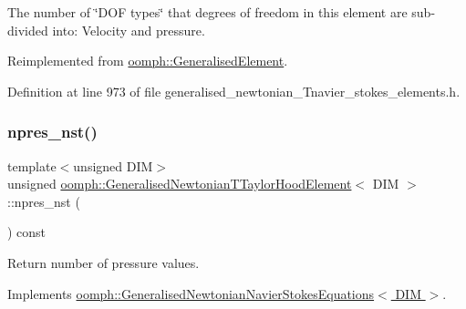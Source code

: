 The number of \char`\"{}\+D\+O\+F types\char`\"{} that degrees of freedom in this element are sub-\/divided into\+: Velocity and pressure. 



Reimplemented from \hyperlink{classoomph_1_1GeneralisedElement_a0c6037a870597b35dcf1c780710b9a56}{oomph\+::\+Generalised\+Element}.



Definition at line 973 of file generalised\+\_\+newtonian\+\_\+\+Tnavier\+\_\+stokes\+\_\+elements.\+h.

\mbox{\label{classoomph_1_1GeneralisedNewtonianTTaylorHoodElement_a290fdfa0f87a6d4a52823c082c298b4f}} 
\subsubsection{\texorpdfstring{npres\+\_\+nst()}{npres\_nst()}\hspace{0.1cm}{\footnotesize\ttfamily [1/3]}}
{\footnotesize\ttfamily template$<$unsigned D\+IM$>$ \\
unsigned \hyperlink{classoomph_1_1GeneralisedNewtonianTTaylorHoodElement}{oomph\+::\+Generalised\+Newtonian\+T\+Taylor\+Hood\+Element}$<$ D\+IM $>$\+::npres\+\_\+nst (\begin{DoxyParamCaption}{ }\end{DoxyParamCaption}) const\hspace{0.3cm}{\ttfamily [virtual]}}



Return number of pressure values. 



Implements \hyperlink{classoomph_1_1GeneralisedNewtonianNavierStokesEquations_ad25a5d1b7a7e7cf128b9154f08739824}{oomph\+::\+Generalised\+Newtonian\+Navier\+Stokes\+Equations$<$ D\+I\+M $>$}.

\mbox{\label{classoomph_1_1GeneralisedNewtonianTTaylorHoodElement_a7097f7c345da00bebde2b6826ed8559b}} 
